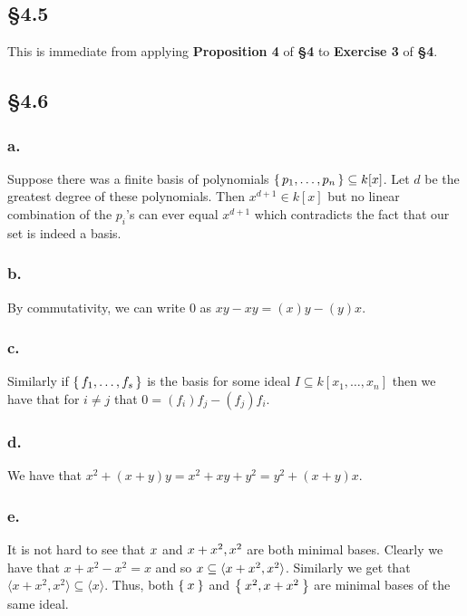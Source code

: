 \documentclass[letterpaper]{article}
\begin{document}
\subsection*{\S 4.5}

This is immediate from applying \textbf{Proposition 4} of \textbf{\S 4} to \textbf{Exercise 3} of \textbf{\S 4}.

\subsection*{\S 4.6}

\subsubsection*{a.}

Suppose there was a finite basis of polynomials $\set{p_{1}, \ldots, p_{n}} \subseteq k[x]$. Let $d$ be the greatest degree of these polynomials. Then $x^{d + 1} \in k[x]$ but no linear combination of the $p_{i}$'s can ever equal $x^{d + 1}$ which contradicts the fact that our set is indeed a basis.

\subsubsection*{b.}

By commutativity, we can write $0$ as $xy - xy = (x)y - (y)x$.

\subsubsection*{c.}

Similarly if $\set{f_{1}, \ldots, f_{s}}$ is the basis for some ideal $I \subseteq k[x_{1}, \ldots, x_{n}]$ then we have that for $i \neq j$ that $0 = (f_{i}) f_{j} - (f_{j}) f_{i}$.

\subsubsection*{d.}

We have that $x^{2} + (x + y)y = x^{2} + xy + y^{2} = y^{2} + (x + y)x$.

\subsubsection*{e.}

It is not hard to see that $\ideal{x}$ and $\ideal{x + x^{2}, x^{2}}$ are both minimal bases.
Clearly we have that $x + x^{2} - x^{2} = x$ and so $\gen{x} \subseteq \langle x + x^{2}, x^{2} \rangle$.
Similarly we get that $\langle x + x^{2}, x^{2} \rangle \subseteq \langle x \rangle$.
Thus, both $\Set{x}$ and $\Set{x^{2}, x + x^{2}}$ are minimal bases of the same ideal.
\end{document}

